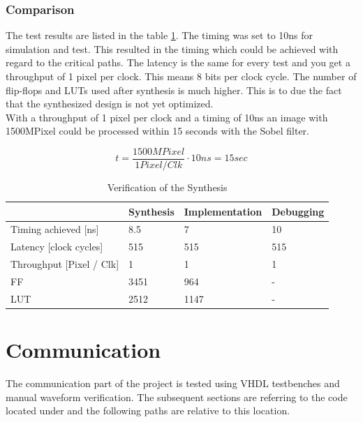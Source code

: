 \subsubsection*{Comparison}
The test results are listed in the table \ref{tab:synthesis}. The timing was set to 10ns for simulation and test. This resulted in the timing which could be achieved with regard to the critical paths. The latency is the same for every test and you get a throughput of 1 pixel per clock. This means 8 bits per clock cycle. The number of flip-flops and LUTs used after synthesis is much higher. This is to due the fact that the synthesized design is not yet optimized. \\

With a throughput of 1 pixel per clock and a timing of 10ns an image with 1500MPixel could be processed within 15 seconds with the Sobel filter.

\begin{equation}
    t = \frac{1500MPixel}{1 Pixel/Clk} \cdot 10ns = 15sec
    \label{eq:throughput}
\end{equation}

\begin{table}[h!]
    \centering
    \begin{tabular}{ l l l l }
        \toprule
         & Synthesis & Implementation & Debugging \\ 
        \midrule
        Timing achieved [ns] & 8.5 & 7 & 10 \\
        Latency [clock cycles] & 515 & 515 & 515 \\ 
        Throughput [Pixel / Clk] & 1  & 1 & 1 \\
        FF & 3451 & 964 & - \\ 
        LUT & 2512 & 1147 & - \\ 
        \bottomrule
    \end{tabular}
    \caption{Verification of the Synthesis}
    \label{tab:synthesis}
\end{table}

%
%
\clearpage
\section{Communication}
The communication part of the project is tested using VHDL testbenches and
manual waveform verification. The subsequent sections are referring to the code
located under  and the following paths are
relative to this location.


